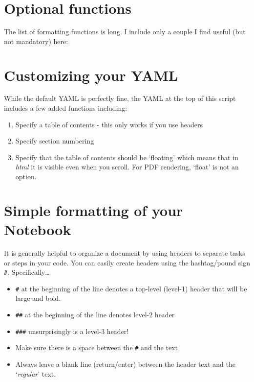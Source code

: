 \documentclass[
]{book}
\providecommand{\tightlist}{%
  \setlength{\itemsep}{0pt}\setlength{\parskip}{0pt}}
\begin{document}
\hypertarget{optional-functions}{%
\section{Optional functions}\label{optional-functions}}

The list of formatting functions is long. I include only a couple I find useful (but not mandatory) here:

\hypertarget{customizing-your-yaml}{%
\section{Customizing your YAML}\label{customizing-your-yaml}}

While the default YAML is perfectly fine, the YAML at the top of this script includes a few added functions including:

\begin{enumerate}
\def\labelenumi{\arabic{enumi}.}
\tightlist
\item
  Specify a table of contents - this only works if you use headers
\item
  Specify section numbering
\item
  Specify that the table of contents should be `floating' which means that in \emph{html} it is visible even when you scroll. For PDF rendering, `float' is not an option.
\end{enumerate}

\hypertarget{simple-formatting-of-your-notebook}{%
\section{Simple formatting of your Notebook}\label{simple-formatting-of-your-notebook}}

It is generally helpful to organize a document by using headers to separate tasks or steps in your code. You can easily create headers using the hashtag/pound sign \texttt{\#}. Specifically\ldots{}

\begin{itemize}
\tightlist
\item
  \texttt{\#} at the beginning of the line denotes a top-level (level-1) header that will be large and bold.
\item
  \texttt{\#\#} at the beginning of the line denotes level-2 header
\item
  \texttt{\#\#\#} unsurprisingly is a level-3 header!
\item
  Make sure there is a space between the \texttt{\#} and the text
\item
  Always leave a blank line (return/enter) between the header text and the `\emph{regular}' text.
\end{itemize}
\end{document}

